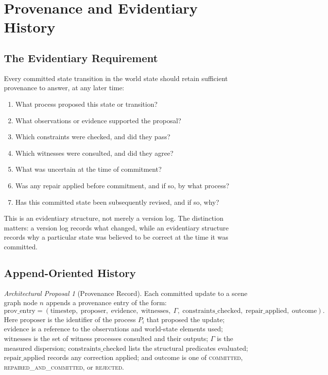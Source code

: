 \documentclass[11pt,a4paper]{article}
\theoremstyle{plain}
\theoremstyle{definition}
\theoremstyle{remark}
\newtheorem{proposal}[theorem]{Architectural Proposal}
\begin{document}
\section{Provenance and Evidentiary History}
\label{sec:provenance}

\subsection{The Evidentiary Requirement}

Every committed state transition in the world state should retain sufficient provenance to answer, at any later time:

\begin{enumerate}[leftmargin=2em,itemsep=0pt]
\item What process proposed this state or transition?
\item What observations or evidence supported the proposal?
\item Which constraints were checked, and did they pass?
\item Which witnesses were consulted, and did they agree?
\item What was uncertain at the time of commitment?
\item Was any repair applied before commitment, and if so, by what process?
\item Has this committed state been subsequently revised, and if so, why?
\end{enumerate}

This is an evidentiary structure, not merely a version log. The distinction matters: a version log records what changed, while an evidentiary structure records why a particular state was believed to be correct at the time it was committed.

\subsection{Append-Oriented History}

\begin{proposal}[Provenance Record]
Each committed update to a scene graph node $n$ appends a provenance entry of the form:
\[
\mathrm{prov\_entry} = (\mathrm{timestep},\; \mathrm{proposer},\; \mathrm{evidence},\; \mathrm{witnesses},\; \Gamma,\; \mathrm{constraints\_checked},\; \mathrm{repair\_applied},\; \mathrm{outcome}).
\]
Here $\mathrm{proposer}$ is the identifier of the process $P_i$ that proposed the update; $\mathrm{evidence}$ is a reference to the observations and world-state elements used; $\mathrm{witnesses}$ is the set of witness processes consulted and their outputs; $\Gamma$ is the measured dispersion; $\mathrm{constraints\_checked}$ lists the structural predicates evaluated; $\mathrm{repair\_applied}$ records any correction applied; and $\mathrm{outcome}$ is one of \textsc{committed}, \textsc{repaired\_and\_committed}, or \textsc{rejected}.
\end{proposal}
\end{document}
